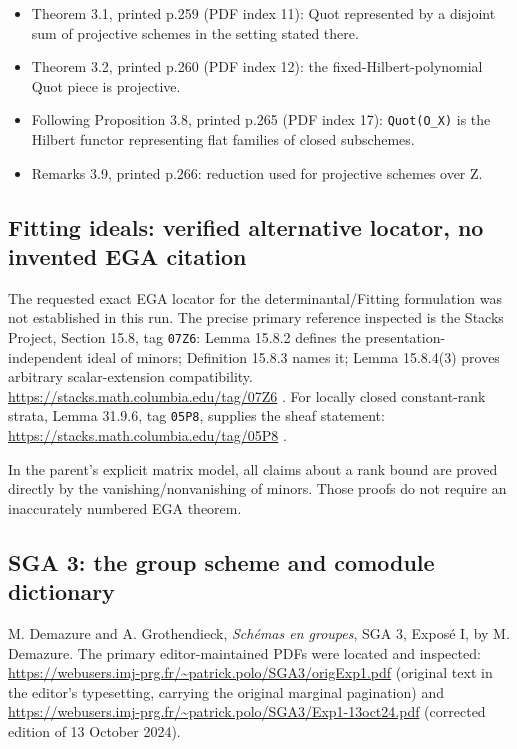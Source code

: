 \documentclass[
  10pt,
]{article}
\providecommand{\tightlist}{%
  \setlength{\itemsep}{0pt}\setlength{\parskip}{0pt}}
\providecommand{\tightlist}{\setlength{\itemsep}{0pt}\setlength{\parskip}{0pt}}
\begin{document}
\begin{itemize}
\tightlist
\item
  Theorem 3.1, printed p.259 (PDF index 11): Quot represented by a
  disjoint sum of projective schemes in the setting stated there.
\item
  Theorem 3.2, printed p.260 (PDF index 12): the
  fixed-Hilbert-polynomial Quot piece is projective.
\item
  Following Proposition 3.8, printed p.265 (PDF index 17):
  \texttt{\small Quot(\allowbreak{}O\_\allowbreak{}X)\allowbreak{}} is
  the Hilbert functor representing flat families of closed subschemes.
\item
  Remarks 3.9, printed p.266: reduction used for projective schemes over
  Z.
\end{itemize}

\subsection{Fitting ideals: verified alternative locator, no invented
EGA
citation}\label{fitting-ideals-verified-alternative-locator-no-invented-ega-citation}

The requested exact EGA locator for the determinantal/Fitting
formulation was not established in this run. The precise primary
reference inspected is the Stacks Project, Section 15.8, tag
\texttt{\small 07Z6}: Lemma 15.8.2 defines the presentation-independent
ideal of minors; Definition 15.8.3 names it; Lemma 15.8.4(3) proves
arbitrary scalar-extension compatibility.
\url{https://stacks.math.columbia.edu/tag/07Z6} . For locally closed
constant-rank strata, Lemma 31.9.6, tag \texttt{\small 05P8}, supplies
the sheaf statement: \url{https://stacks.math.columbia.edu/tag/05P8} .

In the parent's explicit matrix model, all claims about a rank bound are
proved directly by the vanishing/nonvanishing of minors. Those proofs do
not require an inaccurately numbered EGA theorem.

\subsection{SGA 3: the group scheme and comodule
dictionary}\label{sga-3-the-group-scheme-and-comodule-dictionary}

M. Demazure and A. Grothendieck, \emph{Schémas en groupes}, SGA 3,
Exposé I, by M. Demazure. The primary editor-maintained PDFs were
located and inspected:
\url{https://webusers.imj-prg.fr/~patrick.polo/SGA3/origExp1.pdf}
(original text in the editor's typesetting, carrying the original
marginal pagination) and
\url{https://webusers.imj-prg.fr/~patrick.polo/SGA3/Exp1-13oct24.pdf}
(corrected edition of 13 October 2024).
\end{document}
